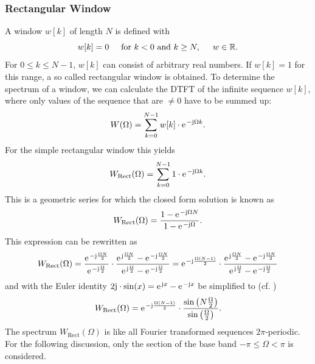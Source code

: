 \documentclass[11pt,a4paper,DIV=12]{scrartcl}
\begin{document}
\subsubsection{Rectangular Window}
A window $w[k]$ of length $N$ is defined with
%
\begin{equation}
w[k]=0 \hspace{5mm} \text{for}\,\,k<0\,\,\text{and}\,\,k\geq N,\hspace{5mm} w\in\mathbb{R}.
\end{equation}
%
For $0\leq k\leq N-1$, $w[k]$ can consist of arbitrary real numbers.
%
If $w[k]=1$ for this range, a so called rectangular window is obtained.
%
To determine the spectrum of a window, we can calculate the DTFT of the
infinite sequence $w[k]$, where only values of the sequence that are $\neq0$
have to be summed up:
%
\begin{equation}
W(\Omega)=\sum_{k=0}^{N-1}w[k]\cdot\e^{-\im\Omega k}.
\end{equation}
%
For the simple rectangular window this yields
%
\begin{equation}
W_\text{Rect}(\Omega)=\sum_{k=0}^{N-1}1\cdot\e^{-\im\Omega k}.
\label{eq:Ansatz_RectWin}
\end{equation}
%
This is a geometric series for which the closed form solution is known
\cite[(3-39)]{Lyons2011} as
%
\begin{equation}
W_\text{Rect}(\Omega)=\frac{1-\e^{-\im\Omega N}}{1-\e^{-\im\Omega}}.
\end{equation}
%
This expression can be rewritten as
%
\begin{equation}
W_\text{Rect}(\Omega)=\frac{\e^{-\im\frac{\Omega N}{2}}}{\e^{-\im\frac{\Omega}{2}}}\cdot\frac{\e^{\im\frac{\Omega N}{2}}-\e^{-\im\frac{\Omega N}{2}}}{\e^{\im\frac{\Omega}{2}}-\e^{-\im\frac{\Omega}{2}}}
=\e^{-\im\frac{\Omega(N-1)}{2}}\cdot\frac{\e^{\im\frac{\Omega N}{2}}-\e^{-\im\frac{\Omega N}{2}}}{\e^{\im\frac{\Omega}{2}}-\e^{-\im\frac{\Omega}{2}}}
\end{equation}
%
and with the Euler identity $2\im\cdot\sin(x)=\e^{\im x}-\e^{-\im x}$ be
simplified to (cf. \cite[(3-42)]{Lyons2011})
%
\begin{equation}
W_\mathrm{Rect}(\Omega)=\e^{-\im\frac{\Omega(N-1)}{2}}\cdot\frac{\sin\left(N\frac{\Omega}{2}\right)}{\sin\left(\frac{\Omega}{2}\right)}.
\label{eq:DTFT_RectWin}
\end{equation}
%
The spectrum $W_\text{Rect}(\Omega)$ is like all Fourier transformed sequences
$2\pi$-periodic.
%
For the following discussion, only the section of the base band
$-\pi\leq\Omega<\pi$ is considered.
\end{document}
